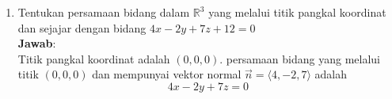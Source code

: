 \documentclass{article}
\begin{document}
\begin{enumerate}
        \item Tentukan persamaan bidang dalam $\mathbb{R}^3$ yang melalui titik pangkal koordinat dan sejajar dengan bidang $4x-2y+7z+12=0$\\
        \textbf{Jawab}:\\
        Titik pangkal koordinat adalah $(0,0,0)$. persamaan bidang yang melalui titik $(0,0,0)$
        dan mempunyai vektor normal $\vec{n}=\langle 4,-2,7\rangle$ adalah
        \[\boxed{4x-2y+7z=0}\]
    \end{enumerate}
\end{document}
